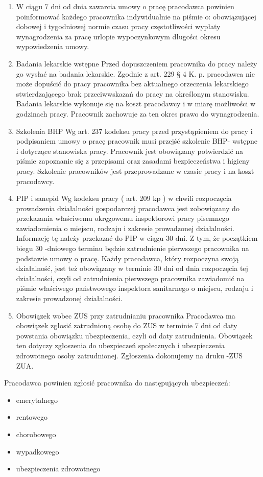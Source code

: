 \documentclass[a4paper, 11pt]{article}
\begin{document}
\begin{enumerate}

\item W ciągu 7 dni od dnia zawarcia umowy o pracę pracodawca powinien poinformować każdego pracownika indywidualnie na piśmie o:
obowiązującej dobowej i tygodniowej normie czasu pracy
częstotliwości wypłaty wynagrodzenia za pracę
urlopie wypoczynkowym
długości okresu wypowiedzenia umowy.
\item  Badania lekarskie wstępne
Przed dopuszczeniem pracownika do pracy należy go wysłać na badania lekarskie.
Zgodnie z art. 229 § 4 K. p. pracodawca nie może dopuścić do pracy pracownika bez aktualnego orzeczenia lekarskiego stwierdzającego brak przeciwwskazań do pracy na określonym stanowisku.
Badania lekarskie wykonuje się na koszt pracodawcy i w miarę możliwości w godzinach pracy.
Pracownik zachowuje za ten okres prawo do wynagrodzenia.
\item  Szkolenia BHP
Wg art. 237 kodeksu pracy przed przystąpieniem do pracy i podpisaniem umowy o pracę pracownik musi przejść szkolenie BHP- wstępne i dotyczące stanowiska pracy. Pracownik jest obowiązany potwierdzić na piśmie zapoznanie się z przepisami oraz zasadami bezpieczeństwa i higieny pracy.
Szkolenie pracowników jest przeprowadzane w czasie pracy i na koszt pracodawcy.
\item PIP i sanepid
Wg kodeksu pracy ( art. 209 kp ) w chwili rozpoczęcia prowadzenia działalności gospodarczej pracodawca jest zobowiązany do przekazania właściwemu okręgowemu inspektorowi pracy pisemnego zawiadomienia o miejscu, rodzaju i zakresie prowadzonej działalności. Informację tę należy przekazać do PIP w ciągu 30 dni. Z tym, że początkiem biegu 30 -dniowego terminu będzie zatrudnienie pierwszego pracownika na podstawie umowy o pracę.
Każdy pracodawca, który rozpoczyna swoją działalność, jest też obowiązany w terminie 30 dni od dnia rozpoczęcia tej działalności, czyli od zatrudnienia pierwszego pracownika zawiadomić na piśmie właściwego państwowego inspektora sanitarnego o miejscu, rodzaju i zakresie prowadzonej działalności.
\item Obowiązek wobec ZUS przy zatrudnianiu pracownika
Pracodawca ma obowiązek zgłosić zatrudnioną osobę do ZUS w terminie 7 dni od daty powstania obowiązku ubezpieczenia, czyli od daty zatrudnienia. Obowiązek ten dotyczy zgłoszenia do ubezpieczeń społecznych i ubezpieczenia zdrowotnego osoby zatrudnionej. Zgłoszenia dokonujemy na druku -ZUS ZUA.
\end{enumerate}
Pracodawca powinien zgłosić pracownika do następujących ubezpieczeń:
\begin{itemize}
\item emerytalnego
\item rentowego
\item chorobowego
\item wypadkowego
\item ubezpieczenia zdrowotnego
\end{itemize}
\end{document}
